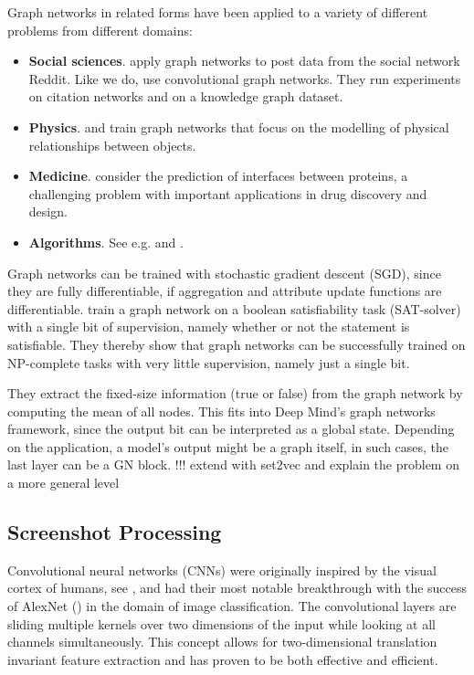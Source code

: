 Graph networks in related forms have been applied to a variety of different problems from different domains:
\begin{itemize}
    \item \textbf{Social sciences}. \cite{graphnetsreddit} apply graph networks to post data from the social network Reddit. Like we do, \cite{graphnetscitationgraph} use convolutional graph networks. They run experiments on citation networks and on a knowledge graph dataset.
    \item \textbf{Physics}. \cite{graphnetsphysicsengine} and \cite{graphnetsphysics2} train graph networks that focus on the modelling of physical relationships between objects.
    \item \textbf{Medicine}. \cite{graphnetsproteininterface} consider the prediction of interfaces between proteins, a challenging problem with important applications in drug discovery and design.
    \item \textbf{Algorithms}. See e.g. \cite{selsam:satsolver} and \cite{dai:graphnetscombinatorialalgo}.
\end{itemize}

Graph networks can be trained with stochastic gradient descent (SGD), since they are fully differentiable, if aggregation and attribute update functions are differentiable. \cite{selsam:satsolver} train a graph network on a boolean satisfiability task (SAT-solver) with a single bit of supervision, namely whether or not the statement is satisfiable. They thereby show that graph networks can be successfully trained on NP-complete tasks with very little supervision, namely just a single bit.

They extract the fixed-size information (true or false) from the graph network by computing the mean of all nodes. This fits into \cite{deepmind:graphnets} Deep Mind's graph networks framework, since the output bit can be interpreted as a global state. Depending on the application, a model's output might be a graph itself, in such cases, the last layer can be a GN block. !!! extend with set2vec and explain the problem on a more general level


\subsection{Screenshot Processing}
\label{sec:screenshotprocessing}

Convolutional neural networks (CNNs) were originally inspired by the visual cortex of humans, see \cite{lecun:lenet}, and had their most notable breakthrough with the success of AlexNet (\cite{krizhevsky:imagenet}) in the domain of image classification. The convolutional layers are sliding multiple kernels over two dimensions of the input while looking at all channels simultaneously. This concept allows for two-dimensional translation invariant feature extraction and has proven to be both effective and efficient.

